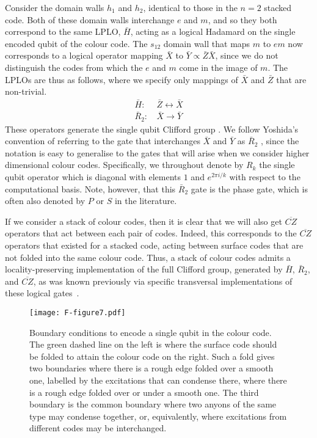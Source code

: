 \documentclass[pra,twocolumn,a4paper,nofootinbib]{revtex4-1}
\begin{document}
Consider the domain walls $h_1$ and $h_2$, identical to those in the $n=2$ stacked code.  Both of these domain walls interchange $e$ and $m$, and so they both correspond to the same LPLO, $\bar{H}$, acting as a logical Hadamard on the single encoded qubit of the colour code.  The $s_{12}$ domain wall that maps $m$ to $em$ now corresponds to a logical operator mapping $\bar{X}$ to $\bar{Y}\propto\bar{Z}\bar{X}$, since we do not distinguish the codes from which the $e$ and $m$ come in the image of $m$. The LPLOs are thus as follows, where we specify only mappings of $\bar{X}$ and $\bar{Z}$ that are non-trivial.
\begin{align}
\bar{H}: &\, \bar{Z} \leftrightarrow \bar{X}\\
\bar{R}_2: &\, \bar{X} \to \bar{Y}
\end{align}
These operators generate the single qubit Clifford group \cite{Terhal}. We follow Yoshida's convention of referring to the gate that interchanges $\bar{X}$ and $\bar{Y}$ as $\bar{R}_2$ \cite{YoshidaA}, since the notation is easy to generalise to the gates that will arise when we consider higher dimensional colour codes. Specifically, we throughout denote by $R_k$ the single qubit operator which is diagonal with elements $1$ and $e^{2\pi i/k}$ with respect to the computational basis. Note, however, that this $\bar{R}_2$ gate is the phase gate, which is often also denoted by $P$ or $S$ in the literature.

If we consider a stack of colour codes, then it is clear that we will also get $\overline{CZ}$ operators that act between each pair of codes. Indeed, this corresponds to the $\overline{CZ}$ operators that existed for a stacked code, acting between surface codes that are not folded into the same colour code. Thus, a stack of colour codes admits a locality-preserving implementation of the full Clifford group, generated by $\bar{H}$, $\bar{R}_2$, and $\overline{CZ}$, as was known previously via specific transversal implementations of these logical gates~\cite{Kubica}.


\begin{figure}
\centering
\texttt{[image: F-figure7.pdf]}
\caption{Boundary conditions to encode a single qubit in the colour code. The green dashed line on the left is where the surface code should be folded to attain the colour code on the right. Such a fold gives two boundaries where there is a rough edge folded over a smooth one, labelled by the excitations that can condense there, where there is a rough edge folded over or under a smooth one. The third boundary is the common boundary where two anyons of the same type may condense together, or, equivalently, where excitations from different codes may be interchanged. \label{fig:2DCC}}
\end{figure}
\end{document}
